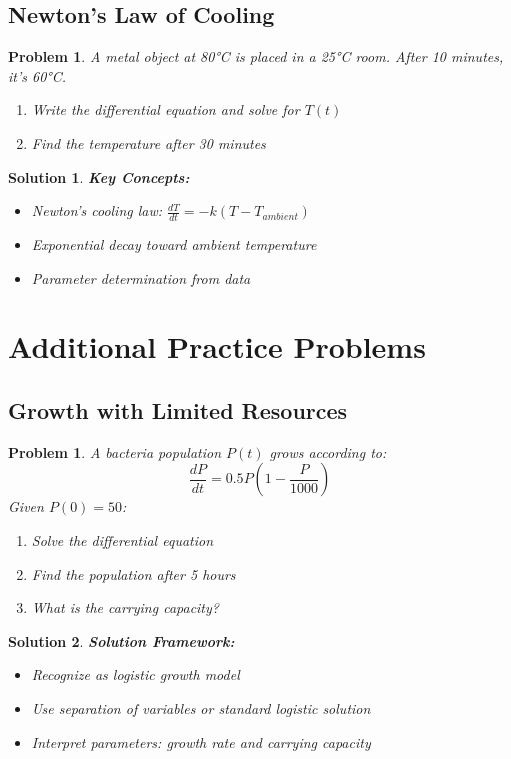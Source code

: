 \documentclass[12pt, letterpaper]{book}
\newcounter{problemcounter}[chapter]
\theoremstyle{problemstyle}
\newtheorem{problem}[problemcounter]{Problem}
\theoremstyle{solutionstyle}
\newtheorem*{solution}{Solution}
\begin{document}
\subsection{Newton's Law of Cooling}

\begin{problem}
A metal object at 80°C is placed in a 25°C room. After 10 minutes, it's 60°C.
\begin{enumerate}
    \item Write the differential equation and solve for $T(t)$
    \item Find the temperature after 30 minutes
\end{enumerate}
\end{problem}

\begin{solution}
\textbf{Key Concepts:}
\begin{itemize}
    \item Newton's cooling law: $\frac{dT}{dt} = -k(T - T_{ambient})$
    \item Exponential decay toward ambient temperature
    \item Parameter determination from data
\end{itemize}
\end{solution}

\section{Additional Practice Problems}

\subsection{Growth with Limited Resources}

\begin{problem}
A bacteria population $P(t)$ grows according to:
$$\frac{dP}{dt} = 0.5P\left(1-\frac{P}{1000}\right)$$
Given $P(0) = 50$:
\begin{enumerate}
    \item Solve the differential equation
    \item Find the population after 5 hours
    \item What is the carrying capacity?
\end{enumerate}
\end{problem}

\begin{solution}
\textbf{Solution Framework:}
\begin{itemize}
    \item Recognize as logistic growth model
    \item Use separation of variables or standard logistic solution
    \item Interpret parameters: growth rate and carrying capacity
\end{itemize}
\end{solution}
\end{document}

